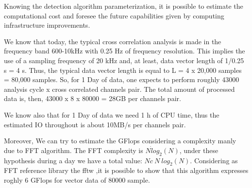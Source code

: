 
    
    Knowing the detection algorithm parameterization, it is possible to estimate the computational cost 
and foresee the future capabilities given by computing infrastructure improvements.    %

We know that today, the typical cross correlation analysis is made in the frequency band 600-10kHz with 0.25 Hz of frequency resolution. This implies the use of a sampling frequency of 20 kHz and, at least, data vector length of 1/0.25 s = 4 s. Thus, the typical data vector length is equal to L = 4 x 20,000 samples = 80,000 samples. So, for 1 Day of data, one expects to perform roughly 43000 analysis cycle x cross correlated channels pair. The total amount of processed data is, then,  43000 x 8 x 80000 = 28GB per channels pair. 

    We know also that for 1 Day of data we need 1 h of CPU time, thus the estimated IO throughout is about 10MB/s per channels pair.


    Moreover, We can try to estimate the GFlops considering a complexity manly due to FFT algorithm. The FFT complexity is $N\dot log_2(N)$,
    under these hypothesis during a day we have a total value: $Nc~N~log_2(N)$.
    Considering as  FFT reference library the fftw \cite{FFTW},it is possible to show that  this algorithm expresses roghly 6 GFlops for vector data of 80000 sample.

